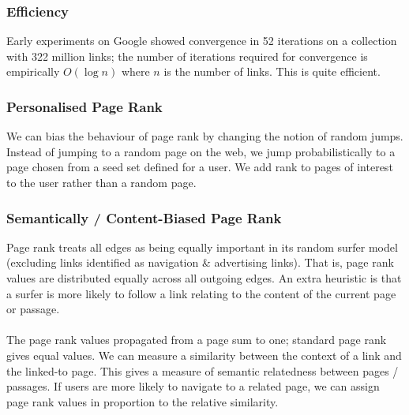 \documentclass[a4paper,11pt]{article}
\begin{document}
\subsubsection{Efficiency}
Early experiments on Google showed convergence in 52 iterations on a collection with 322 million links;
the number of iterations required for convergence is empirically $O(\log n)$ where $n$ is the number of links.
This is quite efficient.

\subsubsection{Personalised Page Rank}
We can bias the behaviour of page rank by changing the notion of random jumps.
Instead of jumping to a random page on the web, we jump probabilistically to a page chosen from a seed set defined for a user.
We add rank to pages of interest to the user rather than a random page.

\subsubsection{Semantically / Content-Biased Page Rank}
Page rank treats all edges as being equally important in its random surfer model (excluding links identified as navigation \& advertising links).
That is, page rank values are distributed equally across all outgoing edges.
An extra heuristic is that a surfer is more likely to follow a link relating to the content of the current page or passage.
\\\\
The page rank values propagated from a page sum to one; standard page rank gives equal values.
We can measure a similarity between the context of a link and the linked-to page.
This gives a measure of semantic relatedness between pages / passages.
If users are more likely to navigate to a related page, we can assign page rank values in proportion to the relative similarity.
\end{document}
